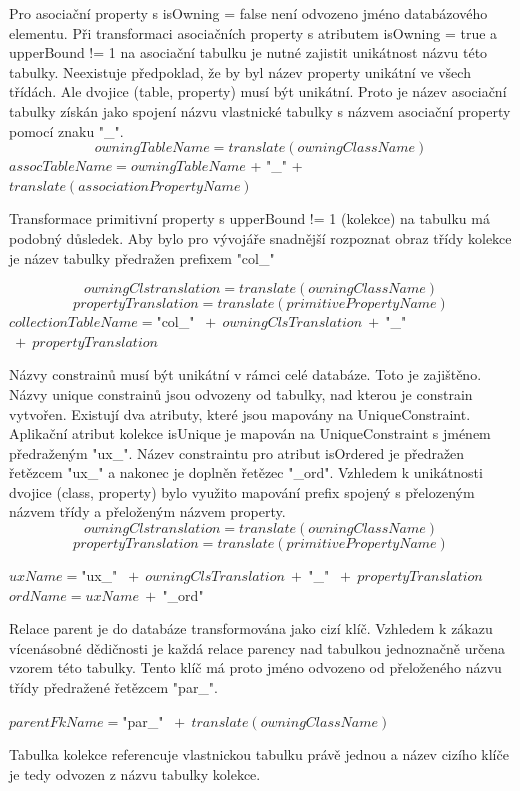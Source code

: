 \documentclass[11pt,twoside,a4paper]{book}
\begin{document}
Pro asociační property s isOwning = false není odvozeno jméno databázového
elementu. Při transformaci asociačních property s atributem isOwning = true a
upperBound != 1 na asociační tabulku je nutné zajistit unikátnost názvu této
tabulky. Neexistuje předpoklad, že by byl název property unikátní ve všech
třídách. Ale dvojice (table, property) musí být unikátní. Proto je název
asociační tabulky získán jako spojení názvu vlastnické tabulky s názvem
asociační property pomocí znaku "\_".
$$owningTableName = translate(owningClassName)$$
$assocTableName = owningTableName$ + "\_" +
$translate(associationPropertyName)$

Transformace primitivní property s upperBound != 1 (kolekce) na tabulku má
podobný důsledek. Aby bylo pro vývojáře snadnější rozpoznat obraz třídy kolekce
je název tabulky předražen prefixem "col\_"

$$owningClstranslation = translate(owningClassName)$$
$$propertyTranslation = translate(primitivePropertyName)$$
$collectionTableName = $"col\_" $\ +\ owningClsTranslation\ +\ $"\_" $\ +\
propertyTranslation$

Názvy constrainů musí být unikátní v rámci celé databáze. Toto je
zajištěno. Názvy unique constrainů jsou odvozeny od tabulky, nad kterou je
constrain vytvořen. Existují dva atributy, které jsou mapovány na 
UniqueConstraint. Aplikační atribut kolekce isUnique je mapován na
UniqueConstraint s jménem předraženým "ux\_". Název constraintu pro
atribut isOrdered je předražen řetězcem "ux\_" a nakonec je doplněn
řetězec "\_ord".
Vzhledem k unikátnosti dvojice (class, property) bylo využito mapování prefix
spojený s přelozeným názvem třídy a přeloženým názvem property.
$$owningClstranslation = translate(owningClassName)$$
$$propertyTranslation = translate(primitivePropertyName)$$

$uxName = $"ux\_" $ \ +\ owningClsTranslation\ +\ $"\_" $\ +\
 propertyTranslation$\\
$ordName = uxName\ +\ $"\_ord"

Relace parent je do databáze transformována jako cizí klíč. Vzhledem k
zákazu vícenásobné dědičnosti je každá relace parency nad tabulkou
jednoznačně určena vzorem této tabulky. Tento klíč má proto jméno odvozeno od
přeloženého názvu třídy předražené řetězcem "par\_".

$ parentFkName = $"par\_" $\ +\ translate(owningClassName)$

Tabulka kolekce referencuje vlastnickou tabulku právě jednou a název cizího
klíče je tedy odvozen z názvu tabulky kolekce.
\end{document}
